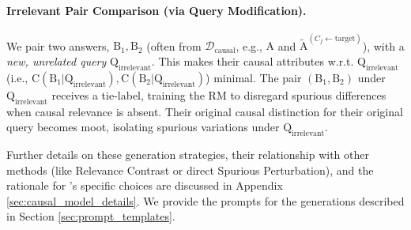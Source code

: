 \vspace{-0.1in} %
\paragraph{Irrelevant Pair Comparison (via Query Modification).}
We pair two answers, $\mathrm{B}_1, \mathrm{B}_2$ (often from $\mathcal{D}_{\mathrm{causal}}$, e.g., $\mathrm{A}$ and $\tilde{\mathrm{A}}^{(C_j \leftarrow \text{target})}$), with a \textit{new, unrelated query} $\mathrm{Q}_{\text{irrelevant}}$. This makes their causal attributes w.r.t. $\mathrm{Q}_{\text{irrelevant}}$ (i.e., $\mathrm{C(B_1|Q_{\text{irrelevant}})}, \mathrm{C(B_2|Q_{\text{irrelevant}})}$) minimal. The pair $(\mathrm{B}_1, \mathrm{B}_2)$ under $\mathrm{Q}_{\text{irrelevant}}$ receives a tie-label, training the RM to disregard spurious differences when causal relevance is absent. Their original causal distinction for their original query becomes moot, isolating spurious variations under $\mathrm{Q}_{\text{irrelevant}}$.




\vspace{-0.05in}
Further details on these generation strategies, their relationship with other methods (like Relevance Contrast or direct Spurious Perturbation), and the rationale for \carma{}'s specific choices are discussed in Appendix \ref{sec:causal_model_details}. 
We provide the prompts for the generations described in Section \ref{sec:prompt_templates}.